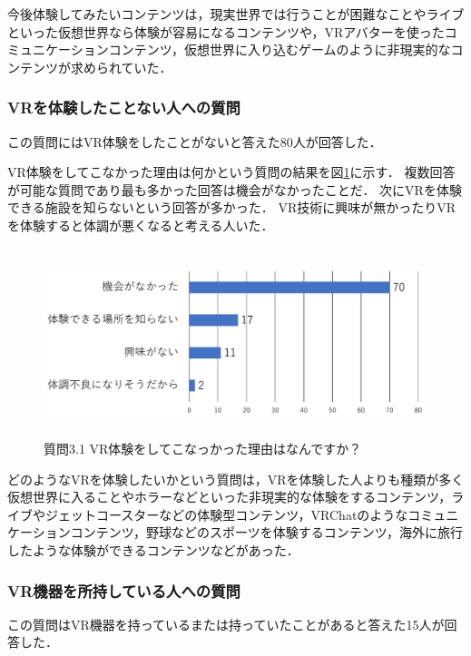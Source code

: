 \documentclass[12pt,a4j]{ltjsarticle}
\begin{document}
今後体験してみたいコンテンツは，現実世界では行うことが困難なことやライブといった仮想世界なら体験が容易になるコンテンツや，VRアバターを使ったコミュニケーションコンテンツ，仮想世界に入り込むゲームのように非現実的なコンテンツが求められていた．

\subsubsection{VRを体験したことない人への質問}
この質問にはVR体験をしたことがないと答えた80人が回答した．

VR体験をしてこなかった理由は何かという質問の結果を図\ref{fig:アンケート結果1_3_1.pdf}に示す．
複数回答が可能な質問であり最も多かった回答は機会がなかったことだ．
次にVRを体験できる施設を知らないという回答が多かった．
VR技術に興味が無かったりVRを体験すると体調が悪くなると考える人いた．

\begin{figure}[h]
\begin{center}
 \includegraphics[clip,height=55mm]{アンケート結果1_3_1.pdf}
\end{center}
 \caption{質問3.1 VR体験をしてこなっかった理由はなんですか？}
 \label{fig:アンケート結果1_3_1.pdf}
\end{figure}

どのようなVRを体験したいかという質問は，VRを体験した人よりも種類が多く仮想世界に入ることやホラーなどといった非現実的な体験をするコンテンツ，ライブやジェットコースターなどの体験型コンテンツ，VRChatのようなコミュニケーションコンテンツ，野球などのスポーツを体験するコンテンツ，海外に旅行したような体験ができるコンテンツなどがあった．

\subsubsection{VR機器を所持している人への質問}
この質問はVR機器を持っているまたは持っていたことがあると答えた15人が回答した．
\end{document}
